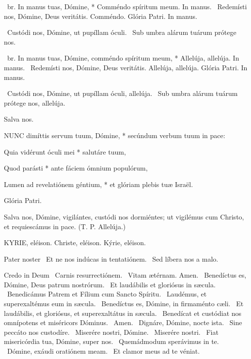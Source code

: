 \R\ br. In manus tuas, Dómine, * Comméndo spíritum meum. In manus. \V\ Redemísti nos, Dómine, Deus veritátis. Comméndo. Glória Patri. In manus.

\V\ Custódi nos, Dómine, ut pupíllam óculi. \R\ Sub umbra alárum tuárum prótege nos.


\R\ br. In manus tuas, Dómine, comméndo spíritum meum, * Allelúja, allelúja. In manus. \V\ Redemísti nos, Dómine, Deus veritátis. Allelúja, allelúja. Glória Patri. In manus.

\V\ Custódi nos, Dómine, ut pupíllam óculi, allelúja. \R\ Sub umbra alárum tuárum prótege nos, allelúja.

 Salva nos.


\lettrine[lines=2]{N}{UNC} dimíttis servum tuum, Dómine, * secúndum verbum tuum in pace:

Quia vidérunt óculi mei * salutáre tuum,

Quod parásti * ante fáciem ómnium populórum,

Lumen ad revelatiónem géntium, * et glóriam plebis tuæ Israël.

Glória Patri.

 Salva nos, Dómine, vigilántes, custódi nos dormiéntes; ut vigilémus cum Christo, et requiescámus in pace. (T. P. Allelúja.)

\sectionornament


KYRIE, eléison. Christe, eléison. Kýrie, eléison.

Pater noster  \V\ Et ne nos indúcas in tentatiónem. \R\ Sed líbera nos a malo.

Credo in Deum  \V\ Carnis resurrectiónem. \R\ Vitam ætérnam. Amen. \V\ Benedíctus es, Dómine, Deus patrum nostrórum. \R\ Et laudábilis et gloriósus in sæcula. \V\ Benedicámus Patrem et Fílium cum Sancto Spíritu. \R\ Laudémus, et superexaltémus eum in sæcula. \V\ Benedíctus es, Dómine, in firmaménto cæli. \R\ Et laudábilis, et gloriósus, et superexaltátus in sæcula. \V\ Benedícat et custódiat nos omnípotens et miséricors Dóminus. \R\ Amen. \V\ Dignáre, Dómine, nocte ista. \R\ Sine peccáto nos custodíre. \V\ Miserére nostri, Dómine. \R\ Miserére nostri. \V\ Fiat misericórdia tua, Dómine, super nos. \R\ Quemádmodum sperávimus in te. \V\ Dómine, exáudi oratiónem meam. \R\ Et clamor meus ad te véniat.

